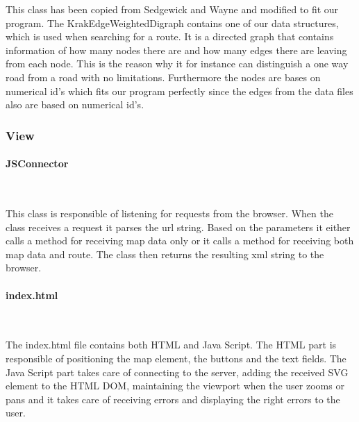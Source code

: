 \documentclass[a4paper,10pt,titlepage]{article}
\begin{document}
This class has been copied from Sedgewick and Wayne and modified to fit our program. The KrakEdgeWeightedDigraph contains one of our data structures, which is used when searching for a route. It is a directed graph that contains information of how many nodes there are and how many edges there are leaving from each node. This is the reason why it for instance can distinguish a one way road from a road with no limitations. Furthermore the nodes are bases on numerical id’s which fits our program perfectly since the edges from the data files also are based on numerical id’s. \\

				
			\subsubsection{View}
			
				\paragraph{JSConnector}\mbox{}\
				
				This class is responsible of listening for requests from the browser. When the class receives a request it parses the url string. Based on the parameters it either calls a method for receiving map data only or it calls a method for receiving both map data and route. The class then returns the resulting xml string to the browser. 
						
				\paragraph{index.html}\mbox{}\
				
				The index.html file contains both HTML and Java Script. The HTML part is responsible of positioning the map element, the buttons and the text fields. The Java Script part takes care of connecting to the server, adding the received SVG element to the HTML DOM, maintaining the viewport when the user zooms or pans and it takes care of receiving errors and displaying the right errors to the user. 
		\newpage	
\end{document}
